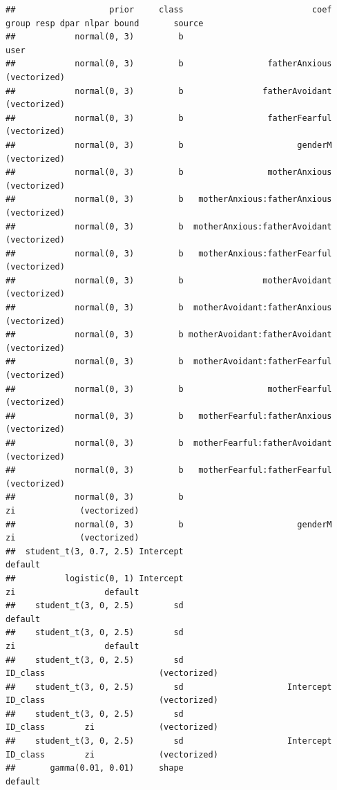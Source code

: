 \documentclass[
]{book}
\begin{document}
\begin{verbatim}
##                   prior     class                          coef    group resp dpar nlpar bound       source
##            normal(0, 3)         b                                                                      user
##            normal(0, 3)         b                 fatherAnxious                                (vectorized)
##            normal(0, 3)         b                fatherAvoidant                                (vectorized)
##            normal(0, 3)         b                 fatherFearful                                (vectorized)
##            normal(0, 3)         b                       genderM                                (vectorized)
##            normal(0, 3)         b                 motherAnxious                                (vectorized)
##            normal(0, 3)         b   motherAnxious:fatherAnxious                                (vectorized)
##            normal(0, 3)         b  motherAnxious:fatherAvoidant                                (vectorized)
##            normal(0, 3)         b   motherAnxious:fatherFearful                                (vectorized)
##            normal(0, 3)         b                motherAvoidant                                (vectorized)
##            normal(0, 3)         b  motherAvoidant:fatherAnxious                                (vectorized)
##            normal(0, 3)         b motherAvoidant:fatherAvoidant                                (vectorized)
##            normal(0, 3)         b  motherAvoidant:fatherFearful                                (vectorized)
##            normal(0, 3)         b                 motherFearful                                (vectorized)
##            normal(0, 3)         b   motherFearful:fatherAnxious                                (vectorized)
##            normal(0, 3)         b  motherFearful:fatherAvoidant                                (vectorized)
##            normal(0, 3)         b   motherFearful:fatherFearful                                (vectorized)
##            normal(0, 3)         b                                               zi             (vectorized)
##            normal(0, 3)         b                       genderM                 zi             (vectorized)
##  student_t(3, 0.7, 2.5) Intercept                                                                   default
##          logistic(0, 1) Intercept                                               zi                  default
##    student_t(3, 0, 2.5)        sd                                                                   default
##    student_t(3, 0, 2.5)        sd                                               zi                  default
##    student_t(3, 0, 2.5)        sd                               ID_class                       (vectorized)
##    student_t(3, 0, 2.5)        sd                     Intercept ID_class                       (vectorized)
##    student_t(3, 0, 2.5)        sd                               ID_class        zi             (vectorized)
##    student_t(3, 0, 2.5)        sd                     Intercept ID_class        zi             (vectorized)
##       gamma(0.01, 0.01)     shape                                                                   default
\end{verbatim}
\end{document}
